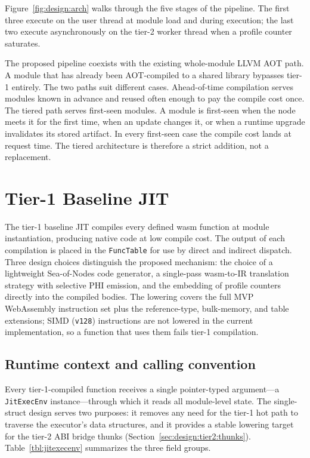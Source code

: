 Figure~\ref{fig:design:arch} walks through the five stages of the pipeline. The first three execute on the user thread at module load and during execution; the last two execute asynchronously on the tier-2 worker thread when a profile counter saturates.

The proposed pipeline coexists with the existing whole-module LLVM AOT path. A module that has already been AOT-compiled to a shared library bypasses tier-1 entirely. The two paths suit different cases. Ahead-of-time compilation serves modules known in advance and reused often enough to pay the compile cost once. The tiered path serves first-seen modules. A module is first-seen when the node meets it for the first time, when an update changes it, or when a runtime upgrade invalidates its stored artifact. In every first-seen case the compile cost lands at request time. The tiered architecture is therefore a strict addition, not a replacement.

\section{Tier-1 Baseline JIT}
\label{sec:design:tier1}

The tier-1 baseline JIT compiles every defined wasm function at module instantiation, producing native code at low compile cost. The output of each compilation is placed in the \texttt{FuncTable} for use by direct and indirect dispatch. Three design choices distinguish the proposed mechanism: the choice of a lightweight Sea-of-Nodes code generator, a single-pass wasm-to-IR translation strategy with selective PHI emission, and the embedding of profile counters directly into the compiled bodies. The lowering covers the full MVP WebAssembly instruction set plus the reference-type, bulk-memory, and table extensions; SIMD (\texttt{v128}) instructions are not lowered in the current implementation, so a function that uses them fails tier-1 compilation.

\subsection{Runtime context and calling convention}
\label{sec:design:tier1:context}

Every tier-1-compiled function receives a single pointer-typed argument---a \texttt{JitExecEnv} instance---through which it reads all module-level state. The single-struct design serves two purposes: it removes any need for the tier-1 hot path to traverse the executor's data structures, and it provides a stable lowering target for the tier-2 ABI bridge thunks (Section~\ref{sec:design:tier2:thunks}). Table~\ref{tbl:jitexecenv} summarizes the three field groups.


